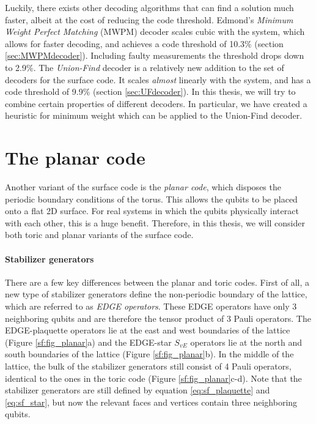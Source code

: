 Luckily, there exists other decoding algorithms that can find a solution much faster, albeit at the cost of reducing the code threshold. Edmond's \emph{Minimum Weight Perfect Matching} (MWPM) decoder scales cubic with the system, which allows for faster decoding, and achieves a code threshold of 10.3\% (section \ref{sec:MWPMdecoder}). Including faulty measurements the threshold drops down to 2.9\%. The \emph{Union-Find} decoder is a relatively new addition to the set of decoders for the surface code. It scales \emph{almost} linearly with the system, and has a code threshold of 9.9\% (section \ref{sec:UFdecoder}). In this thesis, we will try to combine certain properties of different decoders. In particular, we have created a heuristic for minimum weight which can be applied to the Union-Find decoder.

\section{The planar code}\label{sec:surface_planar}

Another variant of the surface code is the \emph{planar code}, which disposes the periodic boundary conditions of the torus. This allows the qubits to be placed onto a flat 2D surface. For real systems in which the qubits physically interact with each other, this is a huge benefit. Therefore, in this thesis, we will consider both toric and planar variants of the surface code. 

\paragraph{Stabilizer generators}
There are a few key differences between the planar and toric codes. First of all, a new type of stabilizer generators define the non-periodic boundary of the lattice, which are referred to as \emph{EDGE operators}. These EDGE operators have only 3 neighboring qubits and are therefore the tensor product of 3 Pauli operators. The EDGE-plaquette operators lie at the east and west boundaries of the lattice (Figure \ref{sf:fig_planar}a) and the EDGE-star $S_{vE}$ operators lie at the north and south boundaries of the lattice (Figure \ref{sf:fig_planar}b). In the middle of the lattice, the bulk of the stabilizer generators still consist of 4 Pauli operators, identical to the ones in the toric code (Figure \ref{sf:fig_planar}c-d). Note that the stabilizer generators are still defined by equation \ref{eq:sf_plaquette} and \ref{eq:sf_star}, but now the relevant faces and vertices contain three neighboring qubits.

